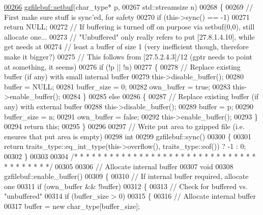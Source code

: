 \begin{DoxyCode}
{\hyperlink{classgzfilebuf_a856bc21f7cfc6ba43f017c9c3f0d5f81}{00266} \hyperlink{classgzfilebuf_a856bc21f7cfc6ba43f017c9c3f0d5f81}{gzfilebuf::setbuf}(char\_type* p,
00267                   std::streamsize n)
00268 \{
00269   \textcolor{comment}{// First make sure stuff is sync'ed, for safety}
00270   \textcolor{keywordflow}{if} (this->sync() == -1)
00271     \textcolor{keywordflow}{return} NULL;
00272   \textcolor{comment}{// If buffering is turned off on purpose via setbuf(0,0), still allocate one...}
00273   \textcolor{comment}{// "Unbuffered" only really refers to put [27.8.1.4.10], while get needs at}
00274   \textcolor{comment}{// least a buffer of size 1 (very inefficient though, therefore make it bigger?)}
00275   \textcolor{comment}{// This follows from [27.5.2.4.3]/12 (gptr needs to point at something, it seems)}
00276   \textcolor{keywordflow}{if} (!p || !n)
00277   \{
00278     \textcolor{comment}{// Replace existing buffer (if any) with small internal buffer}
00279     this->disable\_buffer();
00280     buffer = NULL;
00281     buffer\_size = 0;
00282     own\_buffer = \textcolor{keyword}{true};
00283     this->enable\_buffer();
00284   \}
00285   \textcolor{keywordflow}{else}
00286   \{
00287     \textcolor{comment}{// Replace existing buffer (if any) with external buffer}
00288     this->disable\_buffer();
00289     buffer = p;
00290     buffer\_size = n;
00291     own\_buffer = \textcolor{keyword}{false};
00292     this->enable\_buffer();
00293   \}
00294   \textcolor{keywordflow}{return} \textcolor{keyword}{this};
00295 \}
00296 
00297 \textcolor{comment}{// Write put area to gzipped file (i.e. ensures that put area is empty)}
00298 \textcolor{keywordtype}{int}
00299 gzfilebuf::sync()
00300 \{
00301   \textcolor{keywordflow}{return} traits\_type::eq\_int\_type(this->overflow(), traits\_type::eof()) ? -1 : 0;
00302 \}
00303 
00304 \textcolor{comment}{/* * * * * * * * * * * * * * * * * * * * * * * * * * * * * * * * * * * * * * */}
00305 
00306 \textcolor{comment}{// Allocate internal buffer}
00307 \textcolor{keywordtype}{void}
00308 gzfilebuf::enable\_buffer()
00309 \{
00310   \textcolor{comment}{// If internal buffer required, allocate one}
00311   \textcolor{keywordflow}{if} (own\_buffer && !buffer)
00312   \{
00313     \textcolor{comment}{// Check for buffered vs. "unbuffered"}
00314     \textcolor{keywordflow}{if} (buffer\_size > 0)
00315     \{
00316       \textcolor{comment}{// Allocate internal buffer}
00317       buffer = \textcolor{keyword}{new} char\_type[buffer\_size];
}
\end{DoxyCode}
